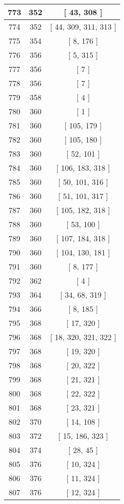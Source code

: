 \begin{center}
\begin{longtable}[H]{|| c c c ||}
\hline
773 & 352 & [ 43, 308 ] \\ 
\hline
774 & 352 & [ 44, 309, 311, 313 ] \\ 
\hline
775 & 354 & [ 8, 176 ] \\ 
\hline
776 & 356 & [ 5, 315 ] \\ 
\hline
777 & 356 & [ 7 ] \\ 
\hline
778 & 356 & [ 7 ] \\ 
\hline
779 & 358 & [ 4 ] \\ 
\hline
780 & 360 & [ 1 ] \\ 
\hline
781 & 360 & [ 105, 179 ] \\ 
\hline
782 & 360 & [ 105, 180 ] \\ 
\hline
783 & 360 & [ 52, 101 ] \\ 
\hline
784 & 360 & [ 106, 183, 318 ] \\ 
\hline
785 & 360 & [ 50, 101, 316 ] \\ 
\hline
786 & 360 & [ 51, 101, 317 ] \\ 
\hline
787 & 360 & [ 105, 182, 318 ] \\ 
\hline
788 & 360 & [ 53, 100 ] \\ 
\hline
789 & 360 & [ 107, 184, 318 ] \\ 
\hline
790 & 360 & [ 104, 130, 181 ] \\ 
\hline
791 & 360 & [ 8, 177 ] \\ 
\hline
792 & 362 & [ 4 ] \\ 
\hline
793 & 364 & [ 34, 68, 319 ] \\ 
\hline
794 & 366 & [ 8, 185 ] \\ 
\hline
795 & 368 & [ 17, 320 ] \\ 
\hline
796 & 368 & [ 18, 320, 321, 322 ] \\ 
\hline
797 & 368 & [ 19, 320 ] \\ 
\hline
798 & 368 & [ 20, 322 ] \\ 
\hline
799 & 368 & [ 21, 321 ] \\ 
\hline
800 & 368 & [ 22, 322 ] \\ 
\hline
801 & 368 & [ 23, 321 ] \\ 
\hline
802 & 370 & [ 14, 108 ] \\ 
\hline
803 & 372 & [ 15, 186, 323 ] \\ 
\hline
804 & 374 & [ 28, 45 ] \\ 
\hline
805 & 376 & [ 10, 324 ] \\ 
\hline
806 & 376 & [ 11, 324 ] \\ 
\hline
807 & 376 & [ 12, 324 ] \\ 

\end{longtable}
\end{center}
